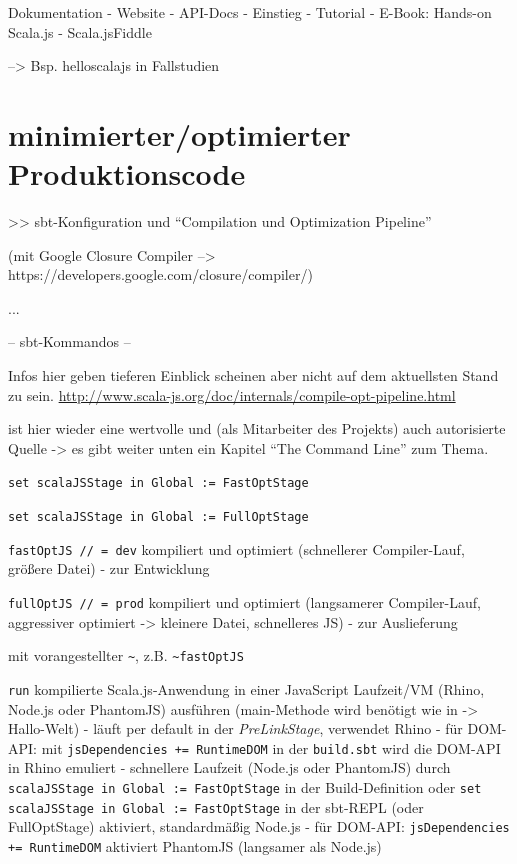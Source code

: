 \documentclass[a4paper, 12pt, hidelinks, listof=totoc, listoftables=totoc, bibliography=totoc]{scrreprt}
\begin{document}
Dokumentation
  - Website
  - API-Docs
  - Einstieg
    - Tutorial
    - E-Book: Hands-on Scala.js
    - Scala.jsFiddle

--> Bsp. helloscalajs in Fallstudien


\section{minimierter/optimierter Produktionscode}
\label{sec:compiler}

>> sbt-Konfiguration und "`Compilation und Optimization Pipeline"'

(mit Google Closure Compiler  -->  https://developers.google.com/closure/compiler/)

...


-- sbt-Kommandos --

Infos hier geben tieferen Einblick scheinen aber nicht auf dem aktuellsten Stand zu sein.
\url{http://www.scala-js.org/doc/internals/compile-opt-pipeline.html}

\cite[\#TheCommandLine]{haoyi.HOS} ist hier wieder eine wertvolle und (als Mitarbeiter des Projekts) auch autorisierte Quelle -> es gibt weiter unten ein Kapitel "`The Command Line"' zum Thema.

\texttt{set scalaJSStage in Global := FastOptStage}

\texttt{set scalaJSStage in Global := FullOptStage}


\texttt{fastOptJS // = dev} kompiliert und optimiert (schnellerer Compiler-Lauf, größere Datei) - zur Entwicklung

\texttt{fullOptJS // = prod} kompiliert und optimiert (langsamerer Compiler-Lauf, aggressiver optimiert -> kleinere Datei, schnelleres JS) - zur Auslieferung

mit vorangestellter  \texttt{\textasciitilde{}}, z.B. \texttt{\textasciitilde{}fastOptJS}

\texttt{run} kompilierte Scala.js-Anwendung in einer JavaScript Laufzeit/VM (Rhino, Node.js oder PhantomJS) ausführen (main-Methode wird benötigt wie in -> Hallo-Welt)
	- läuft per default in der \textit{PreLinkStage}, verwendet Rhino
		- für DOM-API: mit \texttt{jsDependencies += RuntimeDOM} in der \texttt{build.sbt} wird die DOM-API in Rhino emuliert
	- schnellere Laufzeit (Node.js oder PhantomJS) durch \texttt{scalaJSStage in Global := FastOptStage} in der Build-Definition oder \texttt{set scalaJSStage in Global := FastOptStage} in der sbt-REPL (oder FullOptStage) aktiviert, standardmäßig Node.js
		- für DOM-API: \texttt{jsDependencies += RuntimeDOM} aktiviert PhantomJS (langsamer als Node.js)
\end{document}
